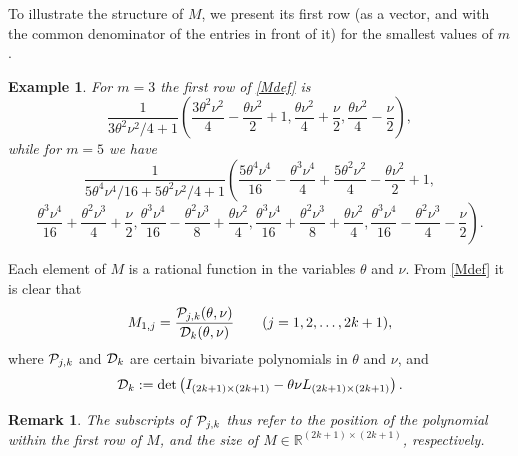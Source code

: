 \documentclass[a4paper]{article}
\newtheorem{remark}{Remark}
\newtheorem{example}{Example}
\newcommand{\te}{\theta}
\newcommand{\cP}{{\cal{P}}}
\newcommand{\cD}{{\cal{D}}}
\begin{document}




To illustrate the structure of $M$, we present its first row (as a vector, and with the common denominator of the entries in front of it) for the smallest values of $m$. 
\begin{example}\label{example1} 
For $m=3$ the first row of \eqref{Mdef} is 
\[
\frac{1}{{3 \theta ^2 \nu ^2}/{4}+1}\left(\frac{3 \theta ^2 \nu ^2}{4}-\frac{\theta  \nu ^2}{2}+1,\frac{\theta  \nu ^2}{4}+\frac{\nu }{2},\frac{\theta  \nu ^2}{4}-\frac{\nu }{2}\right),
\]
while for $m=5$ we have 
\[
\frac{1}{{5 \theta ^4 \nu ^4}/{16}+{5 \theta ^2 \nu ^2}/{4}+1}\left(\frac{5 \theta ^4 \nu ^4}{16}-\frac{\theta ^3 \nu ^4}{4}+\frac{5 \theta ^2 \nu ^2}{4}-\frac{\theta  \nu ^2}{2}+1,\right.
\]
\[
\left.\frac{\theta ^3 \nu
   ^4}{16}+\frac{\theta ^2 \nu ^3}{4}+\frac{\nu }{2},\frac{\theta ^3 \nu ^4}{16}-\frac{\theta ^2 \nu ^3}{8}+\frac{\theta  \nu ^2}{4},\frac{\theta ^3
   \nu ^4}{16}+\frac{\theta ^2 \nu ^3}{8}+\frac{\theta  \nu ^2}{4},\frac{\theta ^3 \nu ^4}{16}-\frac{\theta ^2 \nu ^3}{4}-\frac{\nu }{2}\right).
\]

\end{example}


Each element of $M$ is a rational function in the variables $\te$ and $\nu$. From \eqref{Mdef} it is clear that 
\begin{equation}\label{M1jPjkDk}
M_{1,j}=\frac{\cP_{j,k}(\te,\nu) }{\cD_k(\te,\nu)}\quad\quad(j=1,2,\ldots,2k+1),
\end{equation}
where $\cP_{j,k}$ and $\cD_{k}$ are certain bivariate polynomials in $\te$ and $\nu$, and 
\begin{equation}\label{dendet}
\cD_k:=\det\left(I_{(2k+1)\times(2k+1)}-\te\nu L_{(2k+1)\times(2k+1)}\right).
\end{equation}
\begin{remark}
The subscripts of $\cP_{j,k}$ thus refer to the position of the polynomial within the first row of $M$, and the size of $M\in\mathbb{R}^{(2k+1)\times(2k+1)}$, respectively.
\end{remark}
\end{document}
